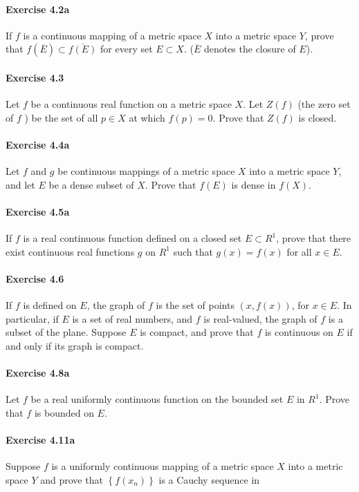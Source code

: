 \documentclass{article}
\begin{document}
\paragraph{Exercise 4.2a} If $f$ is a continuous mapping of a metric space $X$ into a metric space $Y$, prove that $f(\overline{E}) \subset \overline{f(E)}$ for every set $E \subset X$. ($\overline{E}$ denotes the closure of $E$).

\paragraph{Exercise 4.3} Let $f$ be a continuous real function on a metric space $X$. Let $Z(f)$ (the zero set of $f$ ) be the set of all $p \in X$ at which $f(p)=0$. Prove that $Z(f)$ is closed.

\paragraph{Exercise 4.4a} Let $f$ and $g$ be continuous mappings of a metric space $X$ into a metric space $Y$, and let $E$ be a dense subset of $X$. Prove that $f(E)$ is dense in $f(X)$.

\paragraph{Exercise 4.5a} If $f$ is a real continuous function defined on a closed set $E \subset R^{1}$, prove that there exist continuous real functions $g$ on $R^{1}$ such that $g(x)=f(x)$ for all $x \in E$.

\paragraph{Exercise 4.6} If $f$ is defined on $E$, the graph of $f$ is the set of points $(x, f(x))$, for $x \in E$. In particular, if $E$ is a set of real numbers, and $f$ is real-valued, the graph of $f$ is a subset of the plane. Suppose $E$ is compact, and prove that $f$ is continuous on $E$ if and only if its graph is compact.

\paragraph{Exercise 4.8a} Let $f$ be a real uniformly continuous function on the bounded set $E$ in $R^{1}$. Prove that $f$ is bounded on $E$.

\paragraph{Exercise 4.11a} Suppose $f$ is a uniformly continuous mapping of a metric space $X$ into a metric space $Y$ and prove that $\left\{f\left(x_{n}\right)\right\}$ is a Cauchy sequence in
\end{document}
